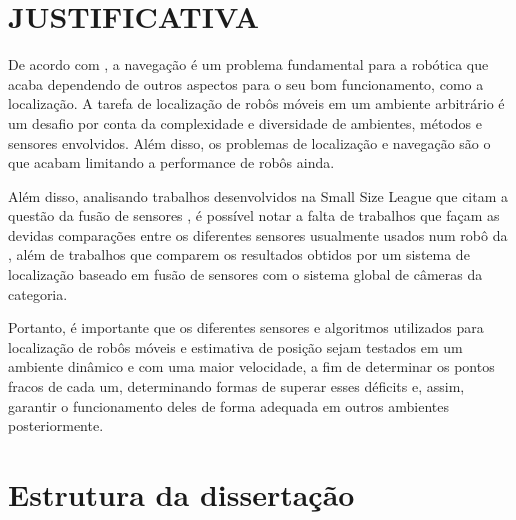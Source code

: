 \documentclass[acronym, symbols, table]{fei}
\begin{document}
	\section{JUSTIFICATIVA}
	
		De acordo com \textcite{alatise2020review}, a navegação é um problema fundamental para a robótica que acaba dependendo de outros aspectos para o seu bom funcionamento, como a localização. A tarefa de localização de robôs móveis em um ambiente arbitrário é um desafio por conta da complexidade e diversidade de ambientes, métodos e sensores envolvidos. Além disso, os problemas de localização e navegação são o que acabam limitando a performance de robôs ainda.
		
		Além disso, analisando trabalhos desenvolvidos na Small Size League que citam a questão da fusão de sensores \cite{Ryll2013TIGERSM, ubc_thunderbots_2017, parsian_2015, parsian_2019, mrl_2020, ubc_thunderbots_2015, immortals_2023}, é possível notar a falta de trabalhos que façam as devidas comparações entre os diferentes sensores usualmente usados num robô da , além de trabalhos que comparem os resultados obtidos por um sistema de localização baseado em fusão de sensores com o sistema global de câmeras da categoria.
		
		Portanto, é importante que os diferentes sensores e algoritmos utilizados para localização de robôs móveis e estimativa de posição sejam testados em um ambiente dinâmico e com uma maior velocidade, a fim de determinar os pontos fracos de cada um, determinando formas de superar esses déficits e, assim, garantir o funcionamento deles de forma adequada em outros ambientes posteriormente.
	
	\section{Estrutura da dissertação}
	
\end{document}
